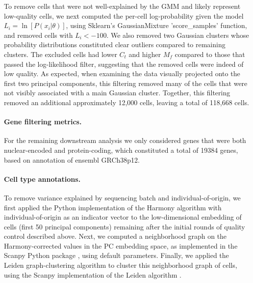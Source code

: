 \documentclass[12pt]{article}
\begin{document}
To remove cells that were not well-explained by the GMM and likely represent low-quality cells, we next computed the per-cell log-probability given the model $L_i = \ln[P(x_i|\theta)]$, using Sklearn's GaussianMixture 'score\_samples' function, and removed cells with $L_i < -100$. We also removed two Gaussian clusters whose probability distributions constituted clear outliers compared to remaining clusters. The excluded cells had lower $C_t$ and higher $M_f$ compared to those that passed the log-likelihood filter, suggesting that the removed cells were indeed of low quality. As expected, when examining the data visually projected onto the first two principal components, this filtering removed many of the cells that were not visibly associated with a main Gaussian cluster. Together, this filtering removed an additional approximately 12,000 cells, leaving a total of 118,668 cells.

\paragraph{Gene filtering metrics.}
For the remaining downstream analysis we only considered genes that were both nuclear-encoded and protein-coding, which constituted a total of 19384 genes, based on annotation of ensembl GRCh38p12. 

\paragraph{Cell type annotations.}
To remove variance explained by sequencing batch and individual-of-origin, we first applied the Python implementation of the Harmony algorithm \cite{Korsunsky2019-qz} with individual-of-origin as an indicator vector to the low-dimensional embedding of cells (first 50 principal components) remaining after the initial rounds of quality control described above. Next, we computed a neighborhood graph on the Harmony-corrected values in the PC embedding space, as implemented in the Scanpy Python package \cite{Wolf2018-jx}, using default parameters. Finally, we applied the Leiden graph-clustering algorithm to cluster this neighborhood graph of cells, using the Scanpy implementation of the Leiden algorithm \cite{Traag2019-xu}.
\end{document}
